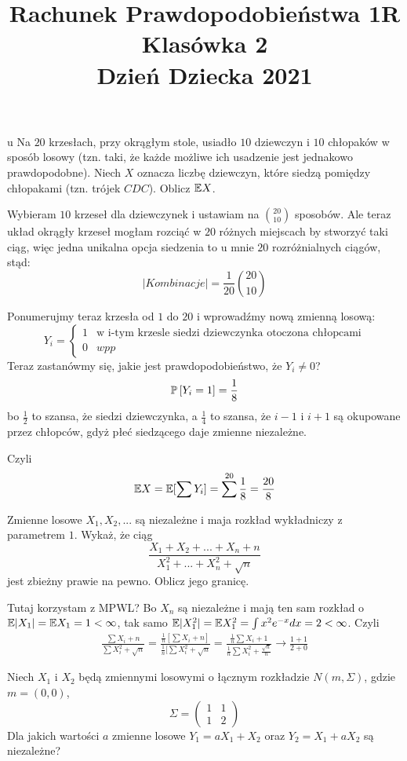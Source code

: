 \documentclass{article}
\title{Rachunek Prawdopodobieństwa 1R\\Klasówka 2\\Dzień Dziecka 2021}
\author{}
\date{}
\begin{document}
\maketitle
\thispagestyle{empty}

\begin{problem}{u}
Na $20$ krzesłach, przy okrągłym stole, usiadło $10$ dziewczyn i $10$ chłopaków w sposób losowy (tzn. taki, że każde możliwe ich usadzenie jest jednakowo prawdopodobne). Niech $X$ oznacza liczbę dziewczyn, które siedzą pomiędzy chłopakami (tzn. trójek $CDC$). Oblicz $\mathbb{E} X$.
\end{problem}

Wybieram $10$ krzeseł dla dziewczynek i ustawiam na ${20\choose 10}$ sposobów. Ale teraz układ okrągły krzeseł mogłam rozciąć w $20$ różnych miejscach by stworzyć taki ciąg, więc jedna unikalna opcja siedzenia to u mnie $20$ rozróżnialnych ciągów, stąd:
$$|Kombinacje|=\frac{1}{20}{20\choose 10}$$

Ponumerujmy teraz krzesła od $1$ do $20$ i wprowadźmy nową zmienną losową:
$$Y_i=\begin{cases}1&\text{w i-tym krzesle siedzi dziewczynka otoczona chłopcami}\\0&wpp\end{cases}$$
Teraz zastanówmy się, jakie jest prawdopodobieństwo, że $Y_i\neq 0$?
$$\prob{Y_i=1}=\frac{1}{8}$$
bo $\frac{1}{2}$ to szansa, że siedzi dziewczynka, a $\frac{1}{4}$ to szansa, że $i-1$ i $i+1$ są okupowane przez chłopców, gdyż płeć siedzącego daje zmienne niezależne.

Czyli
$$\mathbb{E} X=\mathbb{E}[\sum Y_i]=\sum^{20} \frac{1}{8}=\frac{20}{8}$$

\begin{problem}{}
  Zmienne losowe $X_1,X_2,...$ są niezależne i maja rozkład wykładniczy z parametrem $1$. Wykaż, że ciąg
  $$\frac{X_1+X_2+...+X_n+n}{X_1^2+...+X_n^2+\sqrt{n}}$$
  jest zbieżny prawie na pewno. Oblicz jego granicę.
\end{problem}

Tutaj korzystam z MPWL? Bo $X_n$ są niezależne i mają ten sam rozkład o $\mathbb{E} |X_1|=\mathbb{E} X_1=1 <\infty$, tak samo $\mathbb{E} |X_1^2|=\mathbb{E} X_1^2=\int x^2 e^{- x}dx=2<\infty$. Czyli
\begin{align*}
  \frac{\sum X_i+n}{\sum X_i^2+\sqrt{n}}=\frac{\frac{1}{n}[\sum X_i+n]}{\frac{1}{n}[\sum X_i^2+\sqrt{n}}=\frac{\frac{1}{n}\sum X_i+1}{\frac{1}{n}\sum X_i^2+\frac{\sqrt{n}}{n}}\to \frac{1+1}{2+0}
\end{align*}

\begin{problem}{}
  Niech $X_1$ i $X_2$ będą zmiennymi losowymi o łącznym rozkładzie $N(m, \Sigma)$, gdzie $m=(0, 0)$,
  $$\Sigma=\begin{pmatrix}1&1\\1&2\end{pmatrix}$$
  Dla jakich wartości $a$ zmienne losowe $Y_1=aX_1+X_2$ oraz $Y_2=X_1+aX_2$ są niezależne?
\end{problem}
\end{document}
